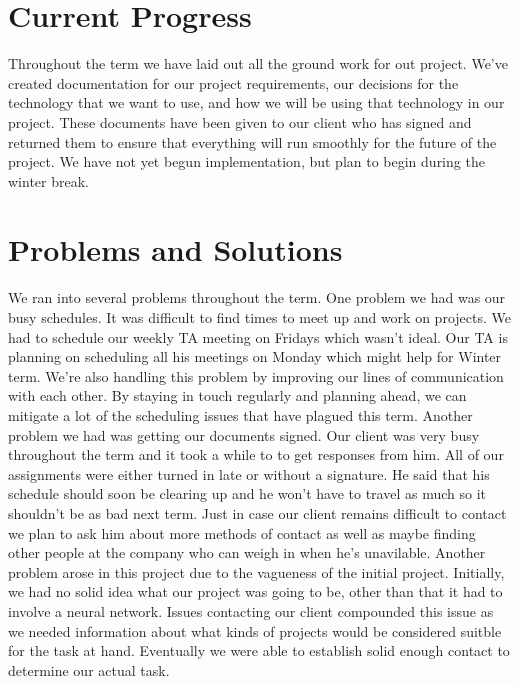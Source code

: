 \documentclass[onecolumn, draftclsnofoot,10pt, compsoc]{IEEEtran}
\begin{document}
\section{Current Progress}
Throughout the term we have laid out all the ground work for out project.
We've created documentation for our project requirements, our decisions for the technology that we want to use, and how we will be using that technology in our project.
These documents have been given to our client who has signed and returned them to ensure that everything will run smoothly for the future of the project.
We have not yet begun implementation, but plan to begin during the winter break.

\section{Problems and Solutions}
We ran into several problems throughout the term.
One problem we had was our busy schedules.
It was difficult to find times to meet up and work on projects.
We had to schedule our weekly TA meeting on Fridays which wasn't ideal.
Our TA is planning on scheduling all his meetings on Monday which might help for Winter term.
We're also handling this problem by improving our lines of communication with each other.
By staying in touch regularly and planning ahead, we can mitigate a lot of the scheduling issues that have plagued this term.
\newline\newline
Another problem we had was getting our documents signed.
Our client was very busy throughout the term and it took a while to to get responses from him.
All of our assignments were either turned in late or without a signature.
He said that his schedule should soon be clearing up and he won't have to travel as much so it shouldn't be as bad next term.
Just in case our client remains difficult to contact we plan to ask him about more methods of contact as well as maybe finding other people at the company who can weigh in when he's unavilable.
\newline\newline
Another problem arose in this project due to the vagueness of the initial project. 
Initially, we had no solid idea what our project was going to be, other than that it had to involve a neural network.
Issues contacting our client compounded this issue as we needed information about what kinds of projects would be considered suitble for the task at hand.
Eventually we were able to establish solid enough contact to determine our actual task.
\end{document}

